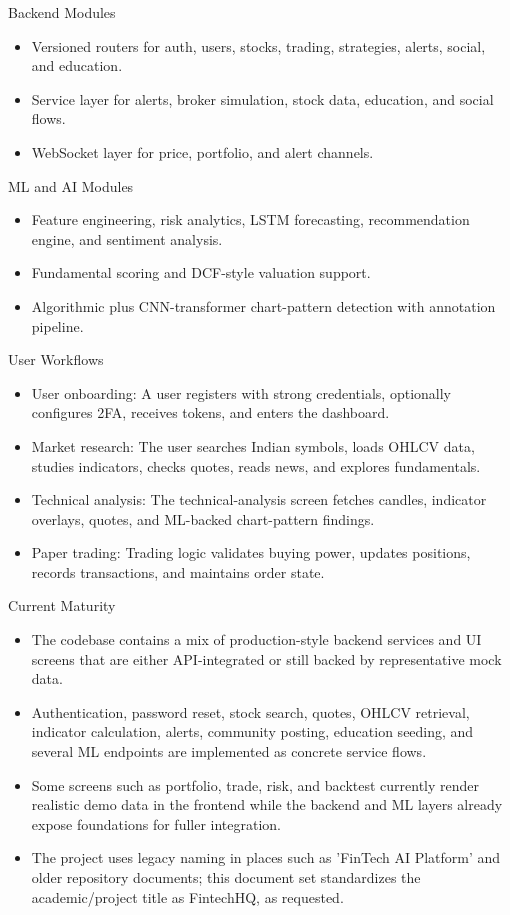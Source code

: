 \documentclass{beamer}
\begin{document}
\begin{frame}{Backend Modules}
\begin{itemize}
\item Versioned routers for auth, users, stocks, trading, strategies, alerts, social, and education.
\item Service layer for alerts, broker simulation, stock data, education, and social flows.
\item WebSocket layer for price, portfolio, and alert channels.
\end{itemize}
\end{frame}
\begin{frame}{ML and AI Modules}
\begin{itemize}
\item Feature engineering, risk analytics, LSTM forecasting, recommendation engine, and sentiment analysis.
\item Fundamental scoring and DCF-style valuation support.
\item Algorithmic plus CNN-transformer chart-pattern detection with annotation pipeline.
\end{itemize}
\end{frame}
\begin{frame}{User Workflows}
\begin{itemize}
\item User onboarding: A user registers with strong credentials, optionally configures 2FA, receives tokens, and enters the dashboard.
\item Market research: The user searches Indian symbols, loads OHLCV data, studies indicators, checks quotes, reads news, and explores fundamentals.
\item Technical analysis: The technical-analysis screen fetches candles, indicator overlays, quotes, and ML-backed chart-pattern findings.
\item Paper trading: Trading logic validates buying power, updates positions, records transactions, and maintains order state.
\end{itemize}
\end{frame}
\begin{frame}{Current Maturity}
\begin{itemize}
\item The codebase contains a mix of production-style backend services and UI screens that are either API-integrated or still backed by representative mock data.
\item Authentication, password reset, stock search, quotes, OHLCV retrieval, indicator calculation, alerts, community posting, education seeding, and several ML endpoints are implemented as concrete service flows.
\item Some screens such as portfolio, trade, risk, and backtest currently render realistic demo data in the frontend while the backend and ML layers already expose foundations for fuller integration.
\item The project uses legacy naming in places such as 'FinTech AI Platform' and older repository documents; this document set standardizes the academic/project title as FintechHQ, as requested.
\end{itemize}
\end{frame}
\end{document}
